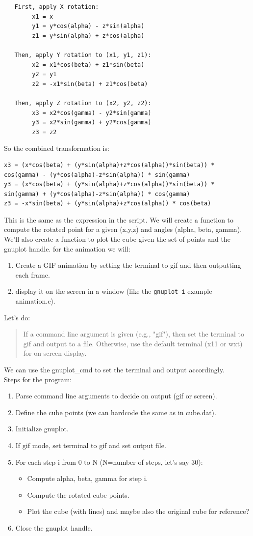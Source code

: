 \documentclass[a4paper,10pt]{article}
\begin{document}
\begin{verbatim}
   First, apply X rotation:
        x1 = x
        y1 = y*cos(alpha) - z*sin(alpha)
        z1 = y*sin(alpha) + z*cos(alpha)

   Then, apply Y rotation to (x1, y1, z1):
        x2 = x1*cos(beta) + z1*sin(beta)
        y2 = y1
        z2 = -x1*sin(beta) + z1*cos(beta)

   Then, apply Z rotation to (x2, y2, z2):
        x3 = x2*cos(gamma) - y2*sin(gamma)
        y3 = x2*sin(gamma) + y2*cos(gamma)
        z3 = z2
\end{verbatim}
So the combined transformation is:\\
{
\scriptsize
\begin{verbatim}
x3 = (x*cos(beta) + (y*sin(alpha)+z*cos(alpha))*sin(beta)) * cos(gamma) - (y*cos(alpha)-z*sin(alpha)) * sin(gamma)
y3 = (x*cos(beta) + (y*sin(alpha)+z*cos(alpha))*sin(beta)) * sin(gamma) + (y*cos(alpha)-z*sin(alpha)) * cos(gamma)
z3 = -x*sin(beta) + (y*sin(alpha)+z*cos(alpha)) * cos(beta)
\end{verbatim}
}
This is the same as the expression in the script.
We will create a function to compute the rotated point for a given (x,y,z) and angles (alpha, beta, gamma).
We'll also create a function to plot the cube given the set of points and the gnuplot handle.
for the animation we will:
\begin{enumerate}
\item Create a GIF animation by setting the terminal to gif and then outputting each frame.
\item display it on the screen in a window (like the \verb|gnuplot_i| example animation.c).
\end{enumerate}
Let's do:
\begin{quote}
        If a command line argument is given (e.g., "gif"), then set the terminal to gif and output to a file.
        Otherwise, use the default terminal (x11 or wxt) for on-screen display.
\end{quote}
We can use the gnuplot\_cmd to set the terminal and output accordingly.\\
Steps for the program:\\
\begin{enumerate}
\item Parse command line arguments to decide on output (gif or screen).
\item Define the cube points (we can hardcode the same as in cube.dat).
\item Initialize gnuplot.
\item If gif mode, set terminal to gif and set output file.
\item For each step i from 0 to N (N=number of steps, let's say 30):
\begin{itemize}
\item Compute alpha, beta, gamma for step i.
\item Compute the rotated cube points.
\item Plot the cube (with lines) and maybe also the original cube for reference?
\end{itemize}
 \item Close the gnuplot handle.
\end{enumerate}
\end{document}
